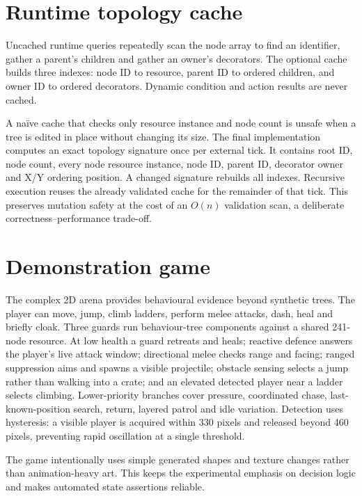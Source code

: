\section{Runtime topology cache}

Uncached runtime queries repeatedly scan the node array to find an identifier, gather a parent's children and gather an owner's decorators. The optional cache builds three indexes: node ID to resource, parent ID to ordered children, and owner ID to ordered decorators. Dynamic condition and action results are never cached.

A naïve cache that checks only resource instance and node count is unsafe when a tree is edited in place without changing its size. The final implementation computes an exact topology signature once per external tick. It contains root ID, node count, every node resource instance, node ID, parent ID, decorator owner and X/Y ordering position. A changed signature rebuilds all indexes. Recursive execution reuses the already validated cache for the remainder of that tick. This preserves mutation safety at the cost of an \(O(n)\) validation scan, a deliberate correctness--performance trade-off.

\section{Demonstration game}

The complex 2D arena provides behavioural evidence beyond synthetic trees. The player can move, jump, climb ladders, perform melee attacks, dash, heal and briefly cloak. Three guards run behaviour-tree components against a shared 241-node resource. At low health a guard retreats and heals; reactive defence answers the player's live attack window; directional melee checks range and facing; ranged suppression aims and spawns a visible projectile; obstacle sensing selects a jump rather than walking into a crate; and an elevated detected player near a ladder selects climbing. Lower-priority branches cover pressure, coordinated chase, last-known-position search, return, layered patrol and idle variation. Detection uses hysteresis: a visible player is acquired within 330 pixels and released beyond 460 pixels, preventing rapid oscillation at a single threshold.

The game intentionally uses simple generated shapes and texture changes rather than animation-heavy art. This keeps the experimental emphasis on decision logic and makes automated state assertions reliable.
